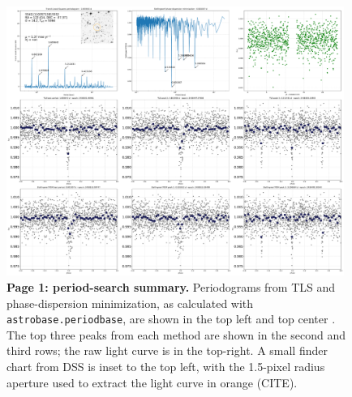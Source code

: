 \documentclass[12pt,twocolumn,tighten]{aastex62}
\begin{document}
\begin{figure}[!h]
	\begin{center}
		\leavevmode
		\includegraphics[width=0.98\textwidth]{gaiatwo0005541111035713815552-0007_page01.pdf}
	\end{center}
	\vspace{-0.5cm}
	\caption{
		{\bf Page 1: period-search summary.} Periodograms from TLS and 
		phase-dispersion minimization, as calculated 
		with \texttt{astrobase.periodbase}, are shown in the top left and top center 
		\citep{bhatti_astrobase_2018,hippke_TLS_2019,stellingwerf_period_1978}.
		The top three peaks from each 
		method are shown in the second and third rows; the raw light curve is in the 
		top-right. A small finder chart from DSS is inset to the top left, with
		the 1.5-pixel radius aperture used to extract the light curve in orange (CITE).
		\label{fig:pg1}
	}
\end{figure}
\end{document}
